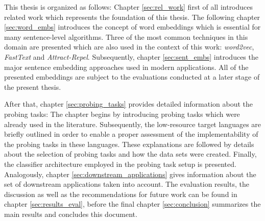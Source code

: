  This thesis is organized as follows: Chapter \vref{sec:rel_work} first of all introduces related work which represents the foundation of this thesis. The following chapter \vref{sec:word_embs} introduces the concept of word embeddings which is essential for many sentence-level algorithms. Three of the most common techniques in this domain are presented which are also used in the context of this work: \textit{word2vec}, \textit{FastText} and \textit{Attract-Repel}. Subsequently, chapter \vref{sec:sent_embs} introduces the major sentence embedding approaches used in modern applications. All of the presented embeddings are subject to the evaluations conducted at a later stage of the present thesis.

After that, chapter \vref{sec:probing_tasks} provides detailed information about the probing tasks: The chapter begins by introducing probing tasks which were already used in the literature. Subsequently, the low-resource target languages are briefly outlined in order to enable a proper assessment of the implementability of the probing tasks in these languages. These explanations are followed by details about the selection of probing tasks and how the data sets were created. Finally, the classifier architecture employed in the probing task setup is presented. Analogously, chapter \vref{sec:downstream_applications} gives information about the set of downstream applications taken into account. The evaluation results, the discussion as well as the recommendations for future work can be found in chapter \vref{sec:results_eval}, before the final chapter \vref{sec:conclusion} summarizes the main results and concludes this document.